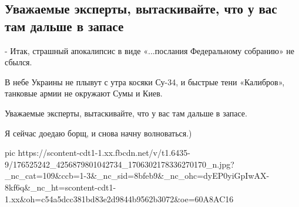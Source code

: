  
 
 
 
 
\subsection{Уважаемые эксперты, вытаскивайте, что у вас там дальше в запасе}
\label{sec:21_04_2021.fb.arestovich_aleksei.1.apokalipsis_ukraina_putin_rossia}

- Итак, страшный апокалипсис в виде «...послания Федеральному собранию» не сбылся.

В небе Украины не плывут с утра косяки Су-34, и быстрые тени «Калибров», танковые армии не окружают Сумы и Киев. 

Уважаемые эксперты, вытаскивайте, что у вас там дальше в запасе. 

Я сейчас доедаю борщ, и снова начну волноваться.)

\ifcmt
  pic https://scontent-cdt1-1.xx.fbcdn.net/v/t1.6435-9/176525242_4256879801042734_1706302178336270170_n.jpg?_nc_cat=109&ccb=1-3&_nc_sid=8bfeb9&_nc_ohc=dyEP0yiGpIwAX-8kf6q&_nc_ht=scontent-cdt1-1.xx&oh=c54a5dcc381bd83e2d9844b9562b3072&oe=60A8AC16
\fi

